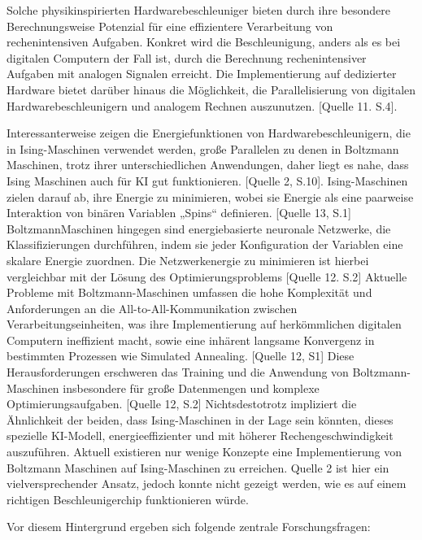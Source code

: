 Solche physikinspirierten Hardwarebeschleuniger bieten durch ihre besondere
Berechnungsweise Potenzial für eine effizientere Verarbeitung von
rechenintensiven Aufgaben. Konkret wird die Beschleunigung, anders als es bei
digitalen Computern der Fall ist, durch die Berechnung rechenintensiver Aufgaben
mit analogen Signalen erreicht. Die Implementierung auf dedizierter Hardware bietet
darüber hinaus die Möglichkeit, die Parallelisierung von digitalen
Hardwarebeschleunigern und analogem Rechnen auszunutzen. [Quelle 11. S.4].

Interessanterweise zeigen die Energiefunktionen von Hardwarebeschleunigern, die
in Ising-Maschinen verwendet werden, große Parallelen zu denen in Boltzmann
Maschinen, trotz ihrer unterschiedlichen Anwendungen, daher liegt es nahe, dass
Ising Maschinen auch für KI gut funktionieren. [Quelle 2, S.10]. Ising-Maschinen
zielen darauf ab, ihre Energie zu minimieren, wobei sie Energie als eine paarweise
Interaktion von binären Variablen „Spins“ definieren. [Quelle 13, S.1] BoltzmannMaschinen hingegen sind energiebasierte neuronale Netzwerke, die
Klassifizierungen durchführen, indem sie jeder Konfiguration der Variablen eine
skalare Energie zuordnen. Die Netzwerkenergie zu minimieren ist hierbei
vergleichbar mit der Lösung des Optimierungsproblems [Quelle 12. S.2] Aktuelle
Probleme mit Boltzmann-Maschinen umfassen die hohe Komplexität und
Anforderungen an die All-to-All-Kommunikation zwischen Verarbeitungseinheiten,
was ihre Implementierung auf herkömmlichen digitalen Computern ineffizient macht,
sowie eine inhärent langsame Konvergenz in bestimmten Prozessen wie Simulated
Annealing. [Quelle 12, S1] Diese Herausforderungen erschweren das Training und
die Anwendung von Boltzmann-Maschinen insbesondere für große Datenmengen
und komplexe Optimierungsaufgaben. [Quelle 12, S.2] Nichtsdestotrotz impliziert die
Ähnlichkeit der beiden, dass Ising-Maschinen in der Lage sein könnten, dieses
spezielle KI-Modell, energieeffizienter und mit höherer Rechengeschwindigkeit
auszuführen. Aktuell existieren nur wenige Konzepte eine Implementierung von
Boltzmann Maschinen auf Ising-Maschinen zu erreichen. Quelle 2 ist hier ein
vielversprechender Ansatz, jedoch konnte nicht gezeigt werden, wie es auf einem
richtigen Beschleunigerchip funktionieren würde.

Vor diesem Hintergrund ergeben sich folgende zentrale Forschungsfragen:

